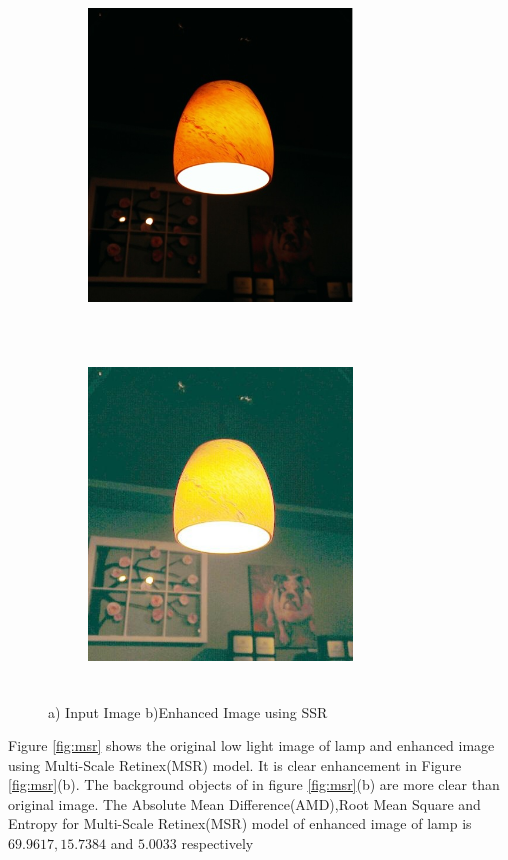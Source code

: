\begin{figure}[!htb]
	\begin{subfigure}{8cm}
		\centering    
    	\includegraphics[width=7cm,height=9cm,keepaspectratio]{images/ch5/bulb_input.jpg}
    	\caption{} 
    \end{subfigure}
  	\begin{subfigure}{6cm}
  		\centering
  		\includegraphics[width=7cm,height=9cm,keepaspectratio]{images/ch5/bulb_ssr.jpg}
   		\caption{}
  	\end{subfigure}
  	\caption{a) Input Image b)Enhanced Image using SSR}
  	\label{fig:ssr}
\end{figure}

Figure \ref{fig:msr} shows the original low light image of lamp and enhanced image using Multi-Scale Retinex(MSR) model. It is clear enhancement in Figure \ref{fig:msr}(b). The background objects of in figure \ref{fig:msr}(b) are more clear than original image. The Absolute Mean Difference(AMD),Root Mean Square and Entropy for Multi-Scale Retinex(MSR) model of enhanced image of lamp is $69.9617, 15.7384$ and $5.0033$ respectively      


